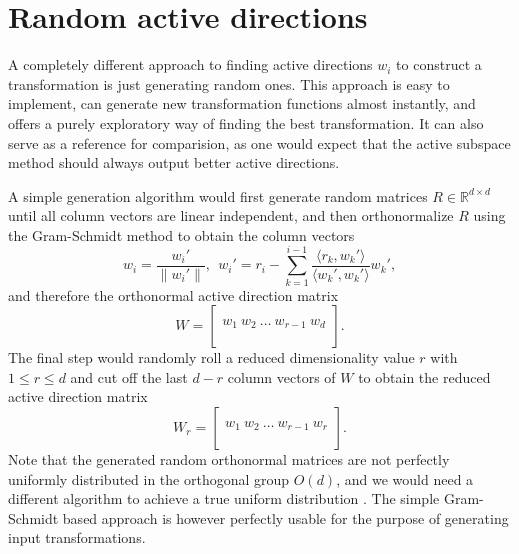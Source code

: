 \documentclass[
  a4paper,  %
  twoside,  %
  bibliography=totoc,
  headsepline,
  cleardoublepage=empty,
  parskip=half,
  draft=false
]{scrbook}
\begin{document}
\section{Random active directions}
\label{sec:rt}

A completely different approach to finding active directions $w_i$ to construct a transformation is just generating random ones.
This approach is easy to implement, can generate new transformation functions almost instantly, and offers a purely exploratory way of finding the best transformation.
It can also serve as a reference for comparision, as one would expect that the active subspace method should always output better active directions.

A simple generation algorithm would first generate random matrices $R \in \mathds{R}^{d \times d}$ until all column vectors are linear independent, and then orthonormalize $R$ using the Gram-Schmidt method to obtain the column vectors
\begin{equation}
w_i=\frac{w_i'}{\| w_i' \|},~~ w_i'=r_i - \sum_{k=1}^{i-1} \frac{\langle r_k,  w_k' \rangle}{\langle w_k', w_k' \rangle} w_k',
\end{equation}
and therefore the orthonormal active direction matrix
\begin{equation}
W = \begin{bmatrix}
  \\
    w_1 ~ w_2 ~ \dots ~ w_{r-1} ~ w_d\\
    \\
  \end{bmatrix}.
\end{equation}
%
The final step would randomly roll a reduced dimensionality value $r$ with $1 \leq r \leq d$ and cut off the last $d-r$ column vectors of $W$ to obtain the reduced active direction matrix
\begin{equation}
W_r = \begin{bmatrix}
  \\
    w_1 ~ w_2 ~ \dots ~ w_{r-1} ~ w_r\\
    \\
  \end{bmatrix}.
\end{equation}
%
Note that the generated random orthonormal matrices are not perfectly uniformly distributed in the orthogonal group $O(d)$, and we would need a different algorithm to achieve a true uniform distribution \cite{Wang2008}.
The simple Gram-Schmidt based approach is however perfectly usable for the purpose of generating input transformations.
\end{document}
